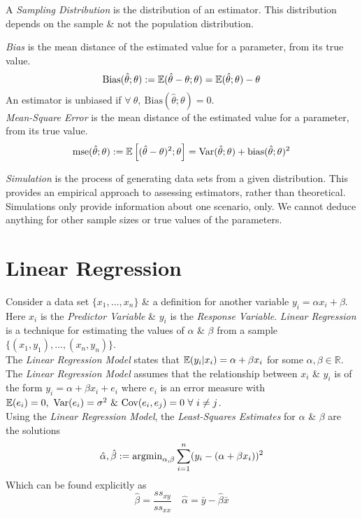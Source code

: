 \documentclass[11pt,a4paper]{article}
\begin{document}
A \textit{Sampling Distribution} is the distribution of an estimator. This distribution depends on the sample \& not the population distribution.

\textit{Bias} is the mean distance of the estimated value for a parameter, from its true value.
$$\mathrm{Bias}(\hat{\theta};\theta):=\mathbb{E}(\hat{\theta}-\theta;\theta)=\mathbb{E}(\hat{\theta};\theta)-\theta$$
\NB An estimator is unbiased if $\forall\ \theta,\ \mathrm{Bias}(\hat{\theta};\theta)=0$.\\


\textit{Mean-Square Error} is the mean distance of the estimated value for a parameter, from its true value.
$$\mathrm{mse}(\hat{\theta};\theta):=\mathbb{E}\left[(\hat{\theta}-\theta)^2;\theta\right]=\mathrm{Var}(\hat{\theta};\theta)+\mathrm{bias}(\hat{\theta};\theta)^2$$

\textit{Simulation} is the process of generating data sets from a given distribution. This provides an empirical approach to assessing estimators, rather than theoretical. Simulations only provide information about one scenario, only. We cannot deduce anything for other sample sizes or true values of the parameters.

\section{Linear Regression}

Consider a data set $\{x_1,\dots,x_n\}$ \& a definition for another variable $y_i=\alpha x_i+\beta$. Here $x_i$ is the \textit{Predictor Variable} \& $y_i$ is the \textit{Response Variable}. \textit{Linear Regression} is a technique for estimating the values of $\alpha$ \& $\beta$ from a sample $\{(x_1,y_1),\dots,(x_n,y_n)\}$.\\

The \textit{Linear Regression Model} states that $\mathbb{E}(y_i|x_i)=\alpha+\beta x_i$ for some $\alpha,\beta\in\mathbb{R}$. The \textit{Linear Regression Model} assumes that the relationship between $x_i$ \& $y_i$ is of the form $y_i=\alpha+\beta x_i+e_i$ where $e_i$ is an error measure with $\expect(e_i)=0,\ \var(e_i)=\sigma^2\ \&\ \mathrm{Cov}(e_i,e_j)=0\ \forall\ i\neq j$.\\

Using the \textit{Linear Regression Model}, the \textit{Least-Squares Estimates} for $\alpha$ \& $\beta$ are the solutions $$\hat{\alpha},\hat{\beta}:=\mathrm{argmin}_{\alpha,\beta}\sum_{i=1}^n(y_i-(\alpha+\beta x_i))^2$$
Which can be found explicitly as
$$\hat{\beta}=\dfrac{ss_{xy}}{ss_{xx}}\quad\hat{\alpha}=\bar{y}-\hat{\beta}\bar{x}$$
\end{document}
